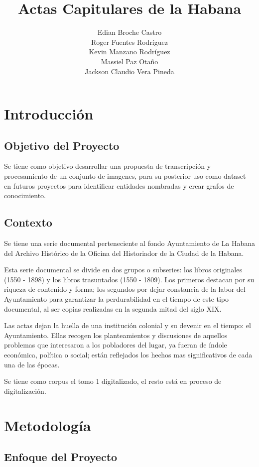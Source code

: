 \documentclass[11pt,a4paper]{article}
\title{Actas Capitulares de la Habana} \author{Edian Broche Castro \\ Roger Fuentes Rodr\'iguez \\ Kevin Manzano Rodr\'iguez \\ Massiel Paz Otaño \\ Jackson Claudio Vera Pineda} \date{}
\begin{document}
\maketitle

\tableofcontents

\section{Introducción}
\subsection{Objetivo del Proyecto} 

Se tiene como objetivo desarrollar una propuesta de transcripción y procesamiento de un conjunto de imagenes, para su posterior uso como dataset en futuros proyectos para identificar entidades nombradas y crear grafos de conocimiento.  

\subsection{Contexto}

Se tiene una serie documental perteneciente al fondo Ayuntamiento de La Habana del Archivo Histórico de la Oficina del Historiador de la Ciudad de la Habana.

Esta serie documental se divide en dos grupos o subseries: los libros originales (1550 - 1898) y los libros trasuntados (1550 - 1809). Los primeros destacan por su riqueza de contenido y forma; los segundos por dejar constancia de la labor del Ayuntamiento para garantizar la perdurabilidad en el tiempo de este tipo documental, al ser copias realizadas en la segunda mitad del siglo XIX.

Las actas dejan la huella de una institución colonial y su devenir en el tiempo: el Ayuntamiento. Ellas recogen los planteamientos y discusiones de aquellos problemas que interesaron a los pobladores del lugar, ya fueran de índole económica, política o social; están reflejados los hechos mas significativos de cada una de las épocas.

Se tiene como corpus el tomo 1 digitalizado, el resto está en proceso de digitalización.

\section{Metodología} 
\subsection{Enfoque del Proyecto} 
\end{document}
